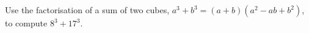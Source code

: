 Use the factorisation of a sum of two cubes, $a^3+b^3=(a+b)\left(a^2-ab+b^2\right)$, to compute $8^3+17^3$.
